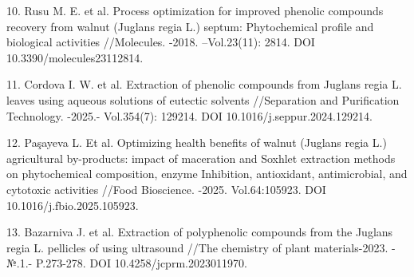 \begin{refs}
10. Rusu M. E. et al. Process optimization for improved phenolic
compounds recovery from walnut (Juglans regia L.) septum: Phytochemical
profile and biological activities //Molecules. -2018. --Vol.23(11):
2814. DOI 10.3390/molecules23112814.

11. Cordova I. W. et al. Extraction of phenolic compounds from Juglans
regia L. leaves using aqueous solutions of eutectic solvents
//Separation and Purification Technology. -2025.- Vol.354(7): 129214.
DOI 10.1016/j.seppur.2024.129214.

12. Paşayeva L. Et al. Optimizing health benefits of walnut (Juglans
regia L.) agricultural by-products: impact of maceration and Soxhlet
extraction methods on phytochemical composition, enzyme Inhibition,
antioxidant, antimicrobial, and cytotoxic activities //Food Bioscience.
-2025. Vol.64:105923. DOI 10.1016/j.fbio.2025.105923.

13. Bazarniva J. et al. Extraction of polyphenolic compounds from the
Juglans regia L. pellicles of using ultrasound //The chemistry of plant
materials-2023. -№.1.- P.273-278. DOI 10.4258/jcprm.2023011970.
\end{refs}

